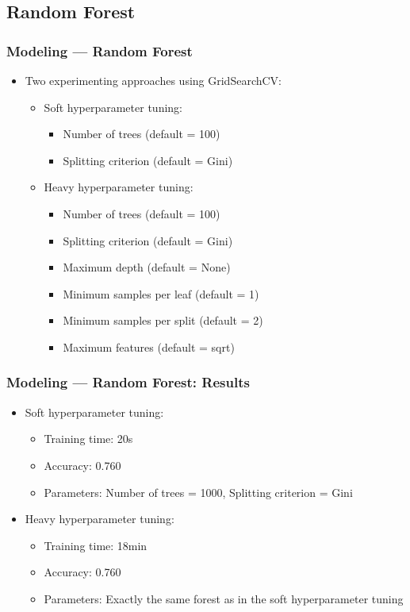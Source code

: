 \documentclass[10pt, aspectratio=169]{beamer}
\begin{document}
\subsection{Random Forest}
\begin{frame}
    \frametitle{Modeling --- Random Forest}
    \begin{itemize}
        \item Two experimenting approaches using GridSearchCV:
        \begin{itemize}
            \item Soft hyperparameter tuning:
            \begin{itemize}
                \item Number of trees (default = 100)
                \item Splitting criterion (default = Gini)
            \end{itemize}
            \item Heavy hyperparameter tuning:
            \begin{itemize}
                \item Number of trees (default = 100)
                \item Splitting criterion (default = Gini)
                \item Maximum depth (default = None)
                \item Minimum samples per leaf (default = 1)
                \item Minimum samples per split (default = 2)
                \item Maximum features (default = sqrt)
            \end{itemize}
        \end{itemize}
    \end{itemize}
\end{frame}

\begin{frame}
    \frametitle{Modeling --- Random Forest: Results}
    \begin{itemize}
        \item Soft hyperparameter tuning:
        \begin{itemize}
            \item Training time: 20s
            \item Accuracy: 0.760
            \item Parameters: Number of trees = 1000, Splitting criterion = Gini
        \end{itemize}
        \item Heavy hyperparameter tuning:
        \begin{itemize}
            \item Training time: 18min
            \item Accuracy: 0.760
            \item Parameters: Exactly the same forest as in the soft hyperparameter tuning
        \end{itemize}
    \end{itemize}
\end{frame}
\end{document}
